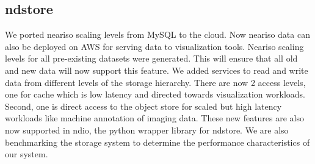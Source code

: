 \documentclass[simplex.tex]{subfiles}
\begin{document}
\subsection{ndstore}

We ported neariso scaling levels from MySQL to the cloud. Now neariso data can also be deployed on AWS for serving data to visualization tools.
Neariso scaling levels for all pre-existing datasets were generated.
This will ensure that all old and new data will now support this feature.
We added services to read and write data from different levels of the storage hierarchy.
There are now 2 access levels, one for cache which is low latency and directed towards visualization workloads.
Second, one is direct access to the object store for scaled but high latency workloads like machine annotation of imaging data.
These new features are also now supported in ndio, the python wrapper library for ndstore.
We are also benchmarking the storage system to determine the performance characteristics of our system.
\par



\end{document}
